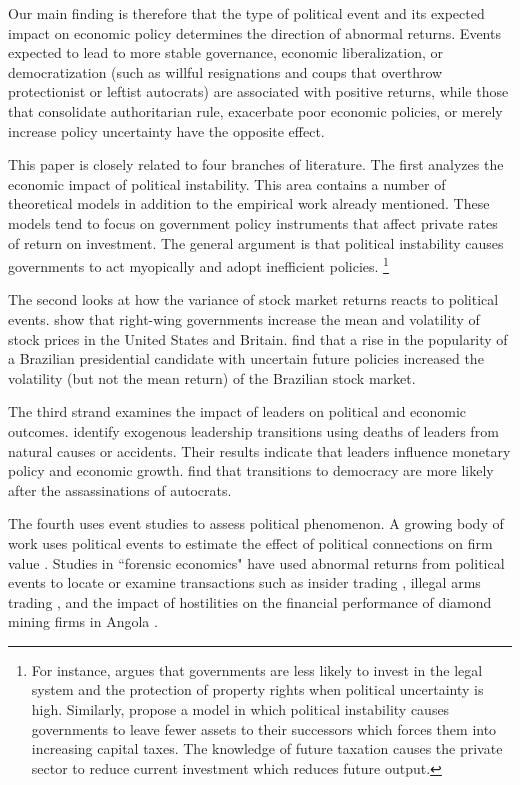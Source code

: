 \documentclass[12pt,final,fleqn]{article}
\theoremstyle{plain}
\begin{document}
Our main finding is therefore that the type of political event and its expected impact on economic policy determines the direction of abnormal returns. Events expected to lead to more stable governance, economic liberalization, or democratization (such as willful resignations and coups that overthrow protectionist or leftist autocrats) are associated with positive returns, while those that consolidate authoritarian rule, exacerbate poor economic policies, or merely increase policy uncertainty have the opposite effect.

\bigskip

This paper is closely related to four branches of literature. The first analyzes the economic impact of political instability. This area contains a number of theoretical models in addition to the empirical work already mentioned. These models tend to focus on government policy instruments that affect private rates of return on investment. The general argument is that political instability causes governments to act myopically and adopt inefficient policies. \footnote{For instance, \citep{svensson1998investment} argues that governments are less likely to invest in the legal system and the protection of property rights when political uncertainty is high. Similarly, \citep{devereux1998political} propose a model in which political instability causes governments to leave fewer assets to their successors which forces them into increasing capital taxes. The knowledge of future taxation causes the private sector to reduce current investment which reduces future output.}

The second looks at how the variance of stock market returns reacts to political events. \citep{leblang2005government} show that right-wing governments increase the mean and volatility of stock prices in the United States and Britain. \citep{jensen2005market} find that a rise in the popularity of a Brazilian presidential candidate with uncertain future policies increased the volatility (but not the mean return) of the Brazilian stock market.

The third strand examines the impact of leaders on political and economic outcomes. \citep{jones2005leaders} identify exogenous leadership transitions using deaths of leaders from natural causes or accidents. Their results indicate that leaders influence monetary policy and economic growth. \citep{jones2009hit} find that transitions to democracy are more likely after the assassinations of autocrats.

The fourth uses event studies to assess political phenomenon. A growing body of work uses political events to estimate the effect of political connections on firm value \citep[e.g.][]{fisman2001estimating,faccio2006politically,goldman2009politically}. Studies in ``forensic economics" have used abnormal returns from political events to locate or examine transactions such as insider trading \citep{dube2011coups}, illegal arms trading \citep{dellavigna2010detecting}, and the impact of hostilities on the financial performance of diamond mining firms in Angola \citep{guidolin2007diamonds}.
\end{document}

